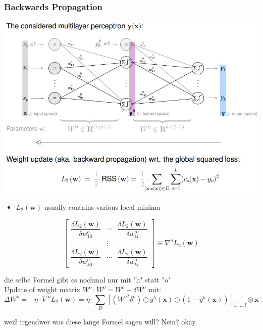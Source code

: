 \documentclass[11pt,a4paper]{article}
\begin{document}
\begin{flushleft}
\subsubsection{Backwards Propagation}
\includegraphics[width= \textwidth]{BackwardProp}
\begin{itemize}
\item $L_2 (\textbf{w})$ usually contains various local minima
\end{itemize}
$$ \begin{bmatrix}
\dfrac{\delta L_2 (\textbf{w})}{\delta w^o_{10}} & \cdots & \dfrac{\delta L_2 (\textbf{w})}{\delta w^o_{1l}} \\
 & \vdots & \\
\dfrac{\delta L_2 (\textbf{w})}{\delta w^o_{k0}} & \cdots &  \dfrac{\delta L_2 (\textbf{w})}{\delta w^o_{kl}}
 \end{bmatrix} \equiv \nabla ^o L_2(\textbf{w}) $$

die selbe Formel gibt es nochmal nur mit "h" statt "o" \\
Update of weight matrix $W^o$: $W^o = W^o + \delta W^o $ mit: 
$$ \Delta W^o = - \eta \cdot \nabla ^o L_2(\textbf{w}) = \eta \cdot \displaystyle\sum_D  [(W^{oT} \delta ^o) \odot y^h (\textbf{x}) \odot (1 - y^h (\textbf{x}) )]_{1,...,l} \otimes \textbf{x} $$

weiß irgendwer was diese lange Formel sagen will? Nein? okay. 


\end{flushleft}
\end{document}
